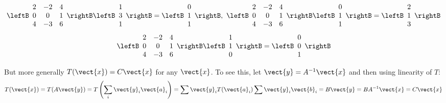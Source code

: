 \begin{solution}
\begin{equation*}
 \leftB
\begin{array}{ccc}
2 & -2 & 4 \\
0 & 0 & 1 \\
4 & -3 & 6
\end{array}
\rightB \leftB
\begin{array}{c}
1 \\
3 \\
1
\end{array}
\rightB =\leftB
\begin{array}{c}
0 \\
1 \\
1
\end{array}
\rightB ,\ \leftB
\begin{array}{ccc}
2 & -2 & 4 \\
0 & 0 & 1 \\
4 & -3 & 6
\end{array}
\rightB \leftB
\begin{array}{c}
0 \\
1 \\
1
\end{array}
\rightB =\leftB
\begin{array}{c}
2 \\
1 \\
3
\end{array}
\rightB
\end{equation*}
\begin{equation*}
\leftB
\begin{array}{ccc}
2 & -2 & 4 \\
0 & 0 & 1 \\
4 & -3 & 6
\end{array}
\rightB \leftB
\begin{array}{c}
1 \\
1 \\
0
\end{array}
\rightB =\leftB
\begin{array}{c}
0 \\
0 \\
1
\end{array}
\rightB
\end{equation*}

But more generally $T(\vect{x})= C\vect{x}$ for any $\vect{x}$. To see this, let $\vect{y}=A^{-1}\vect{x}$ and then using linearity of $T$:
\[ T(\vect{x})= T(A\vect{y}) = T \left( \sum_i \vect{y}_i\vect{a}_i \right) = \sum \vect{y}_i T(\vect{a}_i) \sum \vect{y}_i \vect{b}_i = B\vect{y} = BA^{-1}\vect{x} = C\vect{x}\]
\end{solution}

